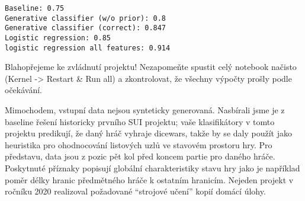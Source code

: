 \documentclass[11pt]{article}
\makeatletter
\newcommand{\boxspacing}{\kern\kvtcb@left@rule\kern\kvtcb@boxsep}
\newcommand{\prompt}[4]{
        {\ttfamily\llap{{\color{#2}[#3]:\hspace{3pt}#4}}\vspace{-\baselineskip}}
    }
\makeatother
\begin{document}
    \begin{Verbatim}[commandchars=\\\{\}]
Baseline: 0.75
Generative classifier (w/o prior): 0.8
Generative classifier (correct): 0.847
Logistic regression: 0.85
logistic regression all features: 0.914
    \end{Verbatim}

    Blahopřejeme ke zvládnutí projektu! Nezapomeňte spustit celý notebook
načisto (Kernel -\textgreater{} Restart \& Run all) a zkontrolovat, že
všechny výpočty prošly podle očekávání.

Mimochodem, vstupní data nejsou synteticky generovaná. Nasbírali jsme je
z baseline řešení historicky prvního SUI projektu; vaše klasifikátory v
tomto projektu predikují, že daný hráč vyhraje dicewars, takže by se
daly použít jako heuristika pro ohodnocování listových uzlů ve stavovém
prostoru hry. Pro představu, data jsou z pozic pět kol před koncem
partie pro daného hráče. Poskytnuté příznaky popisují globální
charakteristiky stavu hry jako je například poměr délky hranic
předmětného hráče k ostatním hranicím. Nejeden projekt v ročníku 2020
realizoval požadované ``strojové učení'' kopií domácí úlohy.

    \begin{tcolorbox}[breakable, size=fbox, boxrule=1pt, pad at break*=1mm,colback=cellbackground, colframe=cellborder]
\prompt{In}{incolor}{ }{\boxspacing}
\begin{Verbatim}[commandchars=\\\{\}]

\end{Verbatim}
\end{tcolorbox}


    
    
    
\end{document}
